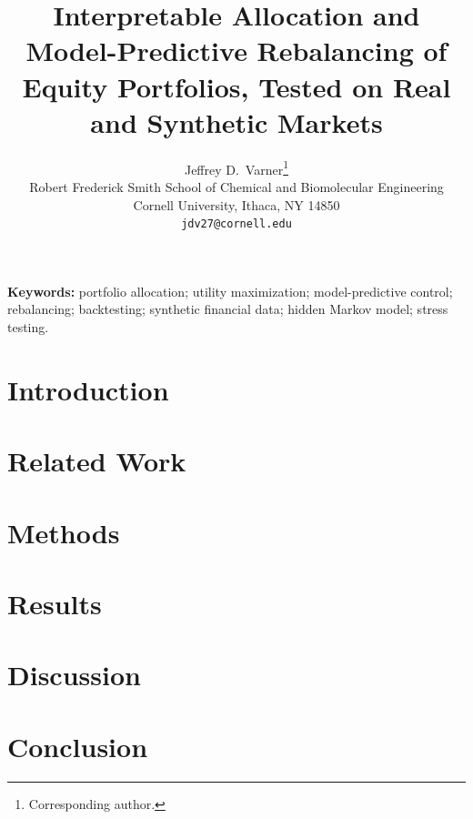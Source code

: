 \documentclass{article}
\title{Interpretable Allocation and Model-Predictive Rebalancing of Equity Portfolios, Tested on Real and
  Synthetic Markets}
\author{%
  Jeffrey D.~Varner\thanks{Corresponding author.} \\
  Robert Frederick Smith School of Chemical and Biomolecular Engineering \\
  Cornell University, Ithaca, NY 14850 \\
  \texttt{jdv27@cornell.edu} \\
}
\begin{document}
\raggedbottom
{}

\maketitle

\begin{abstract}

\end{abstract}

\vspace{0.5em}
\noindent\textbf{Keywords:} portfolio allocation; utility maximization; model-predictive control; rebalancing;
backtesting; synthetic financial data; hidden Markov model; stress testing.

\section{Introduction}\label{sec:introduction}


\section{Related Work}\label{sec:related-work}


\section{Methods}\label{sec:method}





\section{Results}\label{sec:results}


\section{Discussion}\label{sec:discussion}


\section{Conclusion}\label{sec:conclusion}




\clearpage


\end{document}
